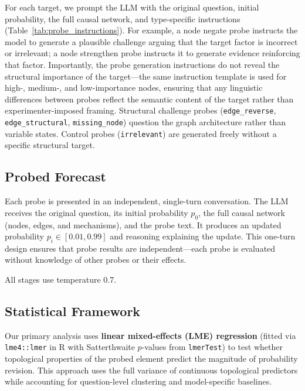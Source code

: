 \documentclass[11pt]{article}
\begin{document}
For each target, we prompt the LLM with the original question, initial probability, the full causal network, and type-specific instructions (Table~\ref{tab:probe_instructions}). For example, a node negate probe instructs the model to generate a plausible challenge arguing that the target factor is incorrect or irrelevant; a node strengthen probe instructs it to generate evidence reinforcing that factor. Importantly, the probe generation instructions do not reveal the structural importance of the target---the same instruction template is used for high-, medium-, and low-importance nodes, ensuring that any linguistic differences between probes reflect the semantic content of the target rather than experimenter-imposed framing. Structural challenge probes (\texttt{edge\_reverse}, \texttt{edge\_structural}, \texttt{missing\_node}) question the graph architecture rather than variable states. Control probes (\texttt{irrelevant}) are generated freely without a specific structural target.


\subsection{Probed Forecast}
\label{sec:probed}

Each probe is presented in an independent, single-turn conversation. The LLM receives the original question, its initial probability $p_0$, the full causal network (nodes, edges, and mechanisms), and the probe text. It produces an updated probability $p_i \in [0.01, 0.99]$ and reasoning explaining the update. This one-turn design ensures that probe results are independent---each probe is evaluated without knowledge of other probes or their effects.

All stages use temperature 0.7.

\subsection{Statistical Framework}
\label{sec:metrics}

Our primary analysis uses \textbf{linear mixed-effects (LME) regression} (fitted via \texttt{lme4::lmer} in R with Satterthwaite $p$-values from \texttt{lmerTest}) to test whether topological properties of the probed element predict the magnitude of probability revision. This approach uses the full variance of continuous topological predictors while accounting for question-level clustering and model-specific baselines.
\end{document}
